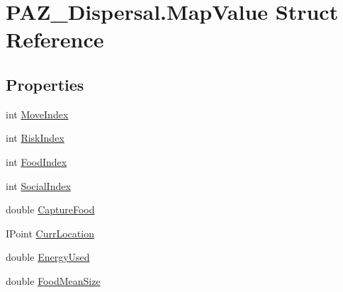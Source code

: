 \hypertarget{struct_p_a_z___dispersal_1_1_map_value}{\section{P\-A\-Z\-\_\-\-Dispersal.\-Map\-Value Struct Reference}
\label{struct_p_a_z___dispersal_1_1_map_value}
}
\subsection*{Properties}
\begin{DoxyCompactItemize}
\item 
int \hyperlink{struct_p_a_z___dispersal_1_1_map_value_a472b48dced5dd08e212c34a09b064870}{Move\-Index}
\item 
int \hyperlink{struct_p_a_z___dispersal_1_1_map_value_af9e3d1d7016aa35c8f6a2db210a3582a}{Risk\-Index}
\item 
int \hyperlink{struct_p_a_z___dispersal_1_1_map_value_a89b946650a46dcabdc15b9b9f227be1c}{Food\-Index}
\item 
int \hyperlink{struct_p_a_z___dispersal_1_1_map_value_acea5eedbcfdefea5cf4f5f824f74e617}{Social\-Index}
\item 
double \hyperlink{struct_p_a_z___dispersal_1_1_map_value_a1407d5890f6662b22647e8a6e9bb7e52}{Capture\-Food}
\item 
I\-Point \hyperlink{struct_p_a_z___dispersal_1_1_map_value_a3132661ca64a8fc504e9935e9fb6695a}{Curr\-Location}
\item 
double \hyperlink{struct_p_a_z___dispersal_1_1_map_value_acdaedce4cd44085840731ac23cf61eb4}{Energy\-Used}
\item 
double \hyperlink{struct_p_a_z___dispersal_1_1_map_value_a34ae5208797966c03855c229a857ecf9}{Food\-Mean\-Size}

\end{DoxyCompactItemize}
